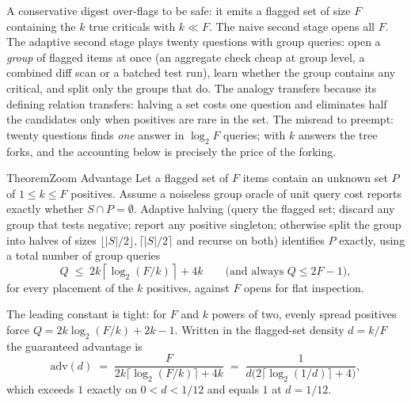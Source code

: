 \documentclass[11pt,a4paper]{article}
\theoremstyle{definition}
\theoremstyle{plain}
\begin{document}

A conservative digest over-flags to be safe: it emits a flagged set of size $F$
containing the $k$ true criticals with $k\ll F$. The naive second stage opens all
$F$. The adaptive second stage plays twenty questions with group queries: open a
\emph{group} of flagged items at once (an aggregate check cheap at group level, a
combined diff scan or a batched test run), learn whether the group contains any
critical, and split only the groups that do. The analogy transfers because its
defining relation transfers: halving a set costs one question and eliminates
half the candidates only when positives are rare in the set. The misread to
preempt: twenty questions finds \emph{one} answer in $\log_2 F$ queries; with $k$
answers the tree forks, and the accounting below is precisely the price of the
forking.
\begin{pdclaim}{Theorem}{Zoom Advantage}
\setlength{\parskip}{4pt plus 1pt}
\label{thm:zoom-advantage}
Let a flagged set of $F$ items contain an unknown set $P$ of $1\le k\le F$
positives. Assume a noiseless group oracle of unit query cost reports exactly
whether $S\cap P=\emptyset$.
Adaptive halving (query
the flagged set; discard any group that tests negative; report any positive
singleton; otherwise split the group into halves of sizes
$\lfloor|S|/2\rfloor,\lceil|S|/2\rceil$ and recurse on both) identifies $P$
exactly, using a total number of group queries
\[
Q \;\le\; 2k\left\lceil\log_2(F/k)\right\rceil + 4k
\qquad\text{(and always } Q\le 2F-1\text{)},
\]
for every placement of the $k$ positives, against $F$ opens for flat inspection.

The leading constant is tight: for $F$ and $k$ powers of two, evenly spread
positives force $Q=2k\log_2(F/k)+2k-1$. Written in the flagged-set density $d=k/F$
the guaranteed advantage is
\[
\mathrm{adv}(d)\;=\;\frac{F}{2k\lceil\log_2(F/k)\rceil+4k}
\;=\;\frac{1}{d\bigl(2\lceil\log_2(1/d)\rceil+4\bigr)},
\]
which exceeds $1$ exactly on $0<d<1/12$ and equals $1$ at $d=1/12$.
\end{pdclaim}
\end{document}
